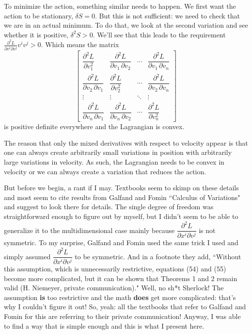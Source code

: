\documentclass[aps,pra,10pt,floatfix,nofootinbib]{revtex4-1}
\theoremstyle{definition}
\begin{document}
To minimize the action, something similar needs to happen. We first want the action to be stationary, $\delta S = 0$. But this is not sufficient: we need to check that we are in an actual minimum. To do that, we look at the second variation and see whether it is positive, $\delta^2 S > 0$. We'll see that this leads to the requirement $\frac{\partial^2L}{\partial v^i \partial v^j} v^i v^j > 0$. Which means the matrix
\begin{equation}
\begin{bmatrix}
\dfrac{\partial^2 L}{\partial v_1^2} & \dfrac{\partial^2 L}{\partial v_1\,\partial v_2} & \cdots & \dfrac{\partial^2 L}{\partial v_1\,\partial v_n} \\[2.2ex]
\dfrac{\partial^2 L}{\partial v_2\,\partial v_1} & \dfrac{\partial^2 L}{\partial v_2^2} & \cdots & \dfrac{\partial^2 L}{\partial v_2\,\partial v_n} \\[2.2ex]
\vdots & \vdots & \ddots & \vdots \\[2.2ex]
\dfrac{\partial^2 L}{\partial v_n\,\partial v_1} & \dfrac{\partial^2 L}{\partial v_n\,\partial v_2} & \cdots & \dfrac{\partial^2 L}{\partial v_n^2}
\end{bmatrix}
\label{lagHessian}
\end{equation}
is positive definite everywhere and the Lagrangian is convex.

The reason that only the mixed derivatives with respect to velocity appear is that one can always create arbitrarily small variations in position with arbitrarily large variations in velocity. As such, the Lagrangian needs to be convex in velocity or we can always create a variation that reduces the action.

But before we begin, a rant if I may. Textbooks seem to skimp on these details and most seem to cite results from Galfand and Fomin ``Calculus of Variations" and suggest to look there for details. %
The single degree of freedom was straightforward enough to figure out by myself, but I didn't seem to be able to generalize it to the multidimensional case mainly because $\dfrac{\partial^2L}{\partial x^i \partial v^j}$ is not symmetric. To my surprise, Galfand and Fomin used the same trick I used and simply assumed $\dfrac{\partial^2L}{\partial x^i \partial v^j}$ to be symmetric. And in a footnote they add, ``Without this assumption, which is unnecessarily restrictive, equations (54) and (55) become more complicated, but it can be shown that Theorems 1 and 2 remain valid (H. Niemeyer, private communication)." Well, no sh*t Sherlock! The assumption \textbf{is} too restrictive and the math \textbf{does} get more complicated: that's why I couldn't figure it out! So, yeah: all the textbooks that refer to Galfand and Fomin for this are referring to their private communication! Anyway, I was able to find a way that is simple enough and this is what I present here.
\end{document}
